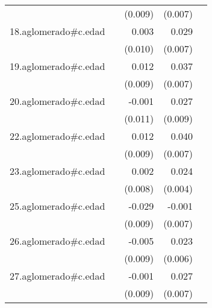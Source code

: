 {\begin{longtable}{l*{4}{D{.}{.}{-1}}}
            &                     &     (0.009)         &     (0.007)         &                     \\
\addlinespace
18.aglomerado#c.edad&                     &       0.003         &       0.029\sym{***}&                     \\
            &                     &     (0.010)         &     (0.007)         &                     \\
\addlinespace
19.aglomerado#c.edad&                     &       0.012         &       0.037\sym{***}&                     \\
            &                     &     (0.009)         &     (0.007)         &                     \\
\addlinespace
20.aglomerado#c.edad&                     &      -0.001         &       0.027\sym{**} &                     \\
            &                     &     (0.011)         &     (0.009)         &                     \\
\addlinespace
22.aglomerado#c.edad&                     &       0.012         &       0.040\sym{***}&                     \\
            &                     &     (0.009)         &     (0.007)         &                     \\
\addlinespace
23.aglomerado#c.edad&                     &       0.002         &       0.024\sym{***}&                     \\
            &                     &     (0.008)         &     (0.004)         &                     \\
\addlinespace
25.aglomerado#c.edad&                     &      -0.029\sym{***}&      -0.001         &                     \\
            &                     &     (0.009)         &     (0.007)         &                     \\
\addlinespace
26.aglomerado#c.edad&                     &      -0.005         &       0.023\sym{***}&                     \\
            &                     &     (0.009)         &     (0.006)         &                     \\
\addlinespace
27.aglomerado#c.edad&                     &      -0.001         &       0.027\sym{***}&                     \\
            &                     &     (0.009)         &     (0.007)         &                     \\

\end{longtable}}
